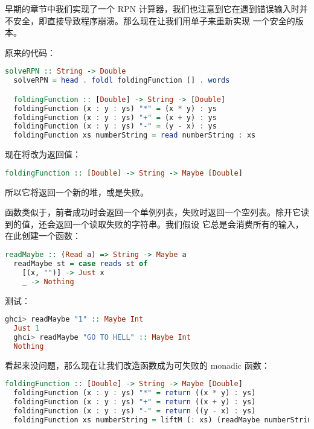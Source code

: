 \documentclass[./main.tex]{subfiles}
\begin{document}
早期的章节中我们实现了一个 RPN 计算器，我们也注意到它在遇到错误输入时并不安全，即直接导致程序崩溃。那么现在让我们用单子来重新实现
一个安全的版本。

原来的代码：

\begin{lstlisting}[language=Haskell]
  solveRPN :: String -> Double
  solveRPN = head . foldl foldingFunction [] . words

  foldingFunction :: [Double] -> String -> [Double]
  foldingFunction (x : y : ys) "*" = (x * y) : ys
  foldingFunction (x : y : ys) "+" = (x + y) : ys
  foldingFunction (x : y : ys) "-" = (y - x) : ys
  foldingFunction xs numberString = read numberString : xs
\end{lstlisting}

现在将改为返回值：

\begin{lstlisting}[language=Haskell]
  foldingFunction :: [Double] -> String -> Maybe [Double]
\end{lstlisting}

所以它将返回一个新的堆，或是失败。

函数类似于，前者成功时会返回一个单例列表，失败时返回一个空列表。除开它读到的值，还会返回一个读取失败的字符串。我们假设
它总是会消费所有的输入，在此创建一个函数：

\begin{lstlisting}[language=Haskell]
  readMaybe :: (Read a) => String -> Maybe a
  readMaybe st = case reads st of
    [(x, "")] -> Just x
    _ -> Nothing
\end{lstlisting}

测试：

\begin{lstlisting}[language=Haskell]
  ghci> readMaybe "1" :: Maybe Int
  Just 1
  ghci> readMaybe "GO TO HELL" :: Maybe Int
  Nothing
\end{lstlisting}

看起来没问题，那么现在让我们改造函数成为可失败的 monadic 函数：

\begin{lstlisting}[language=Haskell]
  foldingFunction :: [Double] -> String -> Maybe [Double]
  foldingFunction (x : y : ys) "*" = return ((x * y) : ys)
  foldingFunction (x : y : ys) "+" = return ((x + y) : ys)
  foldingFunction (x : y : ys) "-" = return ((y - x) : ys)
  foldingFunction xs numberString = liftM (: xs) (readMaybe numberString)
\end{lstlisting}
\end{document}
